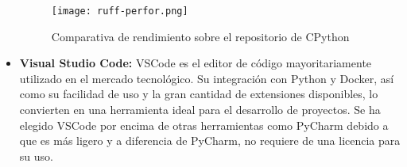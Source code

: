 \begin{itemize}
    \begin{figure}[ht]
        \centering
        \texttt{[image: ruff-perfor.png]}
        \caption{Comparativa de rendimiento sobre el repositorio de CPython}\label{fig:ruff-perfor}
    \end{figure}
    \item \textbf{Visual Studio Code:} VSCode es el editor de código mayoritariamente utilizado
    en el mercado tecnológico. Su integración con Python y Docker, así como su facilidad de uso
    y la gran cantidad de extensiones disponibles, lo convierten en una herramienta ideal para
    el desarrollo de proyectos. Se ha elegido VSCode por encima de otras herramientas como PyCharm
    debido a que es más ligero y a diferencia de PyCharm, no requiere de una licencia para su uso.
\end{itemize}


